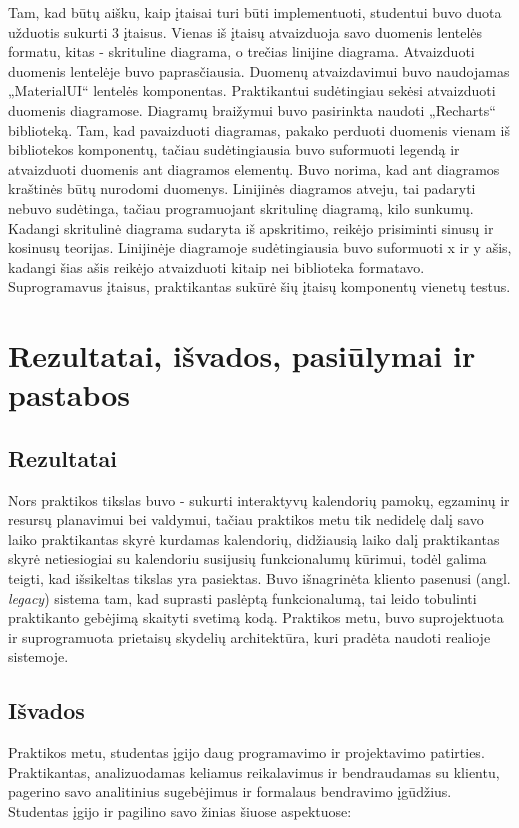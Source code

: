 \documentclass{VUMIFPSbakalaurinis}
\begin{document}
Tam, kad būtų aišku, kaip įtaisai turi būti implementuoti, studentui buvo duota užduotis sukurti 3 įtaisus. Vienas iš įtaisų atvaizduoja savo duomenis lentelės formatu, kitas - skrituline diagrama, o trečias linijine diagrama. Atvaizduoti duomenis lentelėje buvo paprasčiausia. Duomenų atvaizdavimui buvo naudojamas „MaterialUI“ lentelės komponentas. Praktikantui sudėtingiau sekėsi atvaizduoti duomenis diagramose. Diagramų braižymui buvo pasirinkta naudoti „Recharts“ biblioteką. Tam, kad pavaizduoti diagramas, pakako perduoti duomenis vienam iš bibliotekos komponentų, tačiau sudėtingiausia buvo suformuoti legendą ir atvaizduoti duomenis ant diagramos elementų. Buvo norima, kad ant diagramos kraštinės būtų nurodomi duomenys. Linijinės diagramos atveju, tai padaryti nebuvo sudėtinga, tačiau programuojant skritulinę diagramą, kilo sunkumų. Kadangi skritulinė diagrama sudaryta iš apskritimo, reikėjo prisiminti sinusų ir kosinusų teorijas. Linijinėje diagramoje sudėtingiausia buvo suformuoti x ir y ašis, kadangi šias ašis reikėjo atvaizduoti kitaip nei biblioteka formatavo. Suprogramavus įtaisus, praktikantas sukūrė šių įtaisų komponentų vienetų testus.

\section{Rezultatai, išvados, pasiūlymai ir pastabos}

\subsection{Rezultatai}
Nors praktikos tikslas buvo - sukurti interaktyvų kalendorių pamokų, egzaminų ir resursų planavimui bei valdymui, tačiau praktikos metu tik nedidelę dalį savo laiko praktikantas skyrė kurdamas kalendorių, didžiausią laiko dalį praktikantas skyrė netiesiogiai su kalendoriu susijusių funkcionalumų kūrimui, todėl galima teigti, kad išsikeltas tikslas yra pasiektas. Buvo išnagrinėta kliento pasenusi (angl. \textit{legacy}) sistema tam, kad suprasti paslėptą funkcionalumą, tai leido tobulinti praktikanto gebėjimą skaityti svetimą kodą. Praktikos metu, buvo suprojektuota ir suprogramuota prietaisų skydelių architektūra, kuri pradėta naudoti realioje sistemoje.

\subsection{Išvados}
Praktikos metu, studentas įgijo daug programavimo ir projektavimo patirties. Praktikantas, analizuodamas keliamus reikalavimus ir bendraudamas su klientu, pagerino savo analitinius sugebėjimus ir formalaus bendravimo įgūdžius. Studentas įgijo ir pagilino savo žinias šiuose aspektuose:
\end{document}
